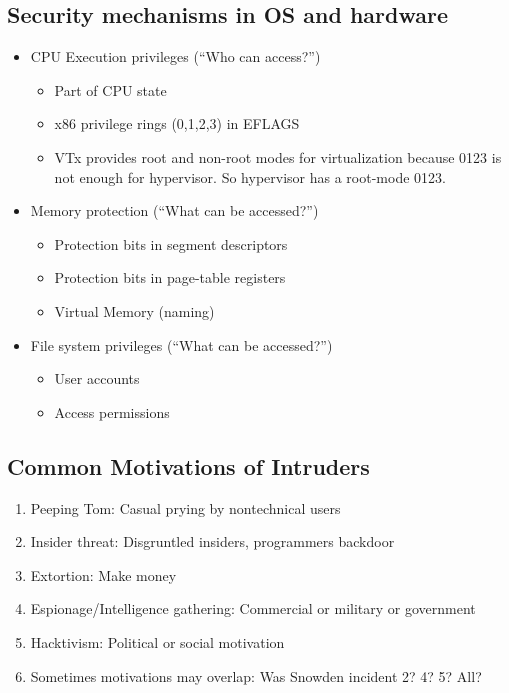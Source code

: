 \documentclass[12pt]{article}
\begin{document}
\subsection{Security mechanisms in OS and hardware}
\begin{itemize}
    \item CPU Execution privileges (“Who can access?”) \begin{itemize}
        \item Part of CPU state
        \item x86 privilege rings (0,1,2,3) in EFLAGS
        \item VTx provides root and non-root modes for virtualization because 0123 is not enough for hypervisor. So hypervisor has a root-mode 0123.
    \end{itemize}
    \item Memory protection (“What can be accessed?”) \begin{itemize}
        \item Protection bits in segment descriptors
        \item Protection bits in page-table registers
        \item Virtual Memory (naming)
    \end{itemize}
    \item File system privileges (“What can be accessed?”) \begin{itemize}
        \item User accounts
        \item Access permissions
    \end{itemize}
\end{itemize}
\subsection{Common Motivations of Intruders}
\begin{enumerate}
    \item Peeping Tom: Casual prying by nontechnical users
    \item Insider threat: Disgruntled insiders, programmers backdoor
    \item Extortion: Make money
    \item Espionage/Intelligence gathering: Commercial or military or government
    \item Hacktivism: Political or social motivation
    \item Sometimes motivations may overlap: Was Snowden incident 2? 4? 5? All?
\end{enumerate}
\end{document}
